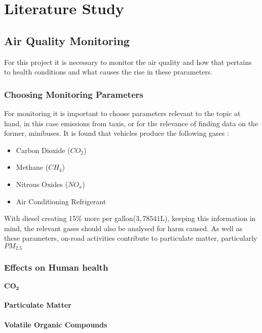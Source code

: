 \chapter{Literature Study}

\section{Air Quality Monitoring}
For this project it is necessary to monitor the air quality and how that pertains to health conditions and what causes the rise in these prarameters.
\subsection{Choosing Monitoring Parameters}
For monitoring it is important to choose parameters relevant to the topic at hand, in this case emissions from taxis, or for the relevance of finding data on the former, minibuses. It is found that vehicles produce the following gases\cite{gasfromvehicles}  :

\begin{itemize}
	\item Carbon Dioxide ($CO_2$)
	\item Methane ($CH_4$)
	\item Nitrous Oxides ($NO_x$)
	\item Air Conditioning Refrigerant
\end{itemize}

\noindent With diesel creating 15\% more per gallon($3,78541\si{\liter}$), keeping this information in mind, the relevant gases should also be analysed for harm caused.
\noindent
As well as these parameters, on-road activities contribute to particulate matter, particularly $PM_{2.5}$ \cite{particulatematter}


\subsection{Effects on Human health}

\subsubsection{$\mathbf{CO_2}$}


\subsubsection{Particulate Matter }

\subsubsection{Volatile Organic Compounds}

